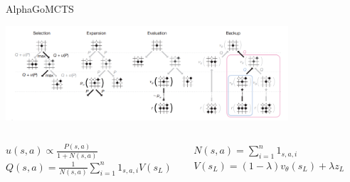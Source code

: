 \begin{frame}{AlphaGo}{MCTS}
    \begin{center}
        \includegraphics[width=10.5cm]{ressources/AlphaGo/MCTS_AlphaGo}
        \begin{block}{}
            \begin{columns}[t]
                \begin{column}{0.5\textwidth}
                    $u(s,a) \propto \frac{P(s,a)}{1+N(s,a)}$
                    $Q(s,a) = \frac{1}{N(s,a)}\sum\limits_{i=1}^{n} 1_{s,a,i} V(s_L)$
                \end{column}
                \begin{column}{0.4\textwidth}
                    $N (s,a) = \sum\limits_{i=1}^{n} 1_{s,a,i} $
                    $V(s_L)=(1-\lambda)v_\theta(s_L) + \lambda z_L$
                \end{column}
            \end{columns}
        \end{block}
    \end{center}
\end{frame}

